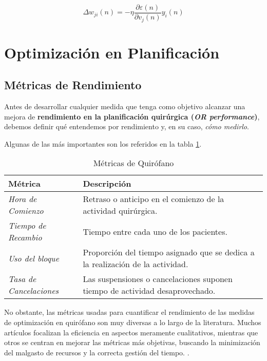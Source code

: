 \begin{equation}
    \Delta w_{ji}(n) = -\eta \frac{\partial \varepsilon (n)}{\partial v_{j}(n)}y_{i}(n)
\end{equation}


\newpage

\section{Optimización en Planificación}


\subsection{Métricas de Rendimiento}

Antes de desarrollar cualquier medida que tenga como objetivo alcanzar una mejora de \textbf{rendimiento en la planificación quirúrgica (\textit{OR performance})}, debemos definir qué entendemos por rendimiento y, en su caso, \textit{cómo medirlo}. 

Algunas de las más importantes son los referidos en  la tabla \ref{Métricas de Quirófano}.
\begin{table}[]
    \centering
    \begin{tabular}{p{7cm}|p{7cm}}
        \toprule
            \textbf{Métrica}   &  \textbf{Descripción}  \\
         \midrule
              \textit{Hora de Comienzo}  &  Retraso o anticipo en el comienzo de la actividad quirúrgica. \\
              \textit{Tiempo de Recambio }& Tiempo entre cada uno de los pacientes. \\
              \textit{Uso del bloque} & Proporción del tiempo asignado que se dedica a la realización de la actividad. \\
              \textit{Tasa de Cancelaciones} & Las suspensiones o cancelaciones suponen tiempo de actividad desaprovechado. \\
       \bottomrule
    \end{tabular}
    \caption{Métricas de Quirófano}
    \label{Métricas de Quirófano}
\end{table}

No obstante, las métricas usadas para cuantificar el rendimiento de las medidas de optimización en quirófano son muy diversas a lo largo de la literatura.
Muchos artículos focalizan la eficiencia en aspectos meramente cualitativos, mientras que otros se centran en mejorar las métricas más objetivas, buscando la minimización del malgasto de recursos y la correcta gestión del tiempo. \cite{Schouten2023OperatingReview}.


